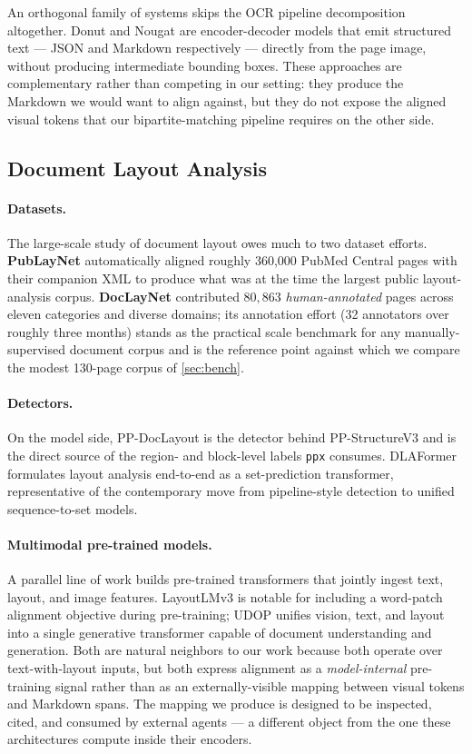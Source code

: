\documentclass{article}
\theoremstyle{definition}
\begin{document}
An orthogonal family of systems skips the OCR pipeline decomposition
altogether.  Donut \cite{kim2022donut} and Nougat
\cite{blecher2023nougat} are encoder-decoder models that emit
structured text --- JSON and Markdown respectively --- directly from
the page image, without producing intermediate bounding boxes.
These approaches are complementary rather than competing in our
setting: they produce the Markdown we would want to align against,
but they do not expose the aligned visual tokens that our
bipartite-matching pipeline requires on the other side.

\subsection{Document Layout Analysis}

\paragraph{Datasets.}  The large-scale study of document layout owes
much to two dataset efforts.  \textbf{PubLayNet}
\cite{zhong2019publaynet} automatically aligned roughly 360{,}000
PubMed Central pages with their companion XML to produce what was at
the time the largest public layout-analysis corpus.
\textbf{DocLayNet} \cite{pfitzmann2022doclaynet} contributed
$80{,}863$ \emph{human-annotated} pages across eleven categories and
diverse domains; its annotation effort (32 annotators over roughly
three months) stands as the practical scale benchmark for any
manually-supervised document corpus and is the reference point against
which we compare the modest 130-page corpus of \cref{sec:bench}.

\paragraph{Detectors.}  On the model side, PP-DocLayout
\cite{PPDocLayout} is the detector behind PP-StructureV3 and is the
direct source of the region- and block-level labels \texttt{ppx}
consumes.  DLAFormer \cite{wang2024dlaformer} formulates layout
analysis end-to-end as a set-prediction transformer, representative
of the contemporary move from pipeline-style detection to unified
sequence-to-set models.

\paragraph{Multimodal pre-trained models.}  A parallel line of work
builds pre-trained transformers that jointly ingest text, layout,
and image features.  LayoutLMv3 \cite{huang2022layoutlmv3} is
notable for including a word-patch alignment objective during
pre-training; UDOP \cite{tang2023udop} unifies vision, text, and
layout into a single generative transformer capable of document
understanding and generation.  Both are natural neighbors to our
work because both operate over text-with-layout inputs, but both
express alignment as a \emph{model-internal} pre-training signal
rather than as an externally-visible mapping between visual tokens
and Markdown spans.  The mapping we produce is designed to be
inspected, cited, and consumed by external agents --- a different
object from the one these architectures compute inside their
encoders.
\end{document}
